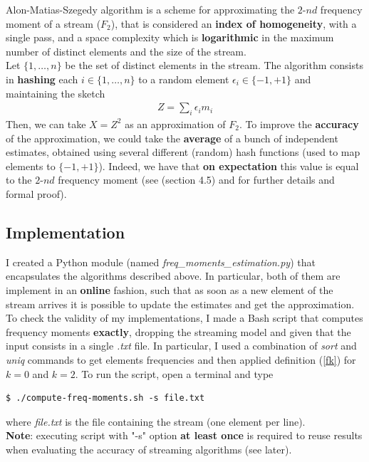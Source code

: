 Alon-Matias-Szegedy algorithm is a scheme for approximating the $2\text{-}nd$ frequency moment of a stream ($F_2$), that is considered an \textbf{index of homogeneity}, with a single pass, and a space complexity which is \textbf{logarithmic} in the maximum number of distinct elements and the size of the stream.\\
Let $\{1,\ldots,n\}$ be the set of distinct elements in the stream. The algorithm consists in \textbf{hashing} each $i \in \{1,\ldots,n\}$ to a random element $\epsilon_i \in \{-1,+1\}$ and maintaining the sketch
\begin{align*}
	Z = \sum_{i} \epsilon_i m_i
\end{align*}
Then, we can take $X = Z^2$ as an approximation of $F_2$. To improve the \textbf{accuracy} of the approximation, we could take the \textbf{average} of a bunch of independent estimates, obtained using several different (random) hash functions (used to map elements to $\{-1,+1\}$). Indeed, we have that \textbf{on expectation} this value is equal to the $2\text{-}nd$ frequency moment (see \cite{mmd} (section 4.5) and \cite{dm-streams} for further details and formal proof).


\subsection{Implementation}

I created a Python module (named \textit{freq\_moments\_estimation.py}) that encapsulates the algorithms described above. In particular, both of them are implement in an \textbf{online} fashion, such that as soon as a new element of the stream arrives it is possible to update the estimates and get the approximation.\\
To check the validity of my implementations, I made a Bash script that computes frequency moments \textbf{exactly}, dropping the streaming model and given that the input consists in a single \textit{.txt} file. In particular, I used a combination of \textit{sort} and \textit{uniq} commands to get elements frequencies and then applied definition (\ref{fk}) for $k = 0$ and $k = 2$. To run the script, open a terminal and type
\begin{lstlisting}
$ ./compute-freq-moments.sh -s file.txt
\end{lstlisting}
where \textit{file.txt} is the file containing the stream (one element per line).\\ 
\textbf{Note}: executing script with "-s" option \textbf{at least once} is required to reuse results when evaluating the accuracy of streaming algorithms (see later).\\

